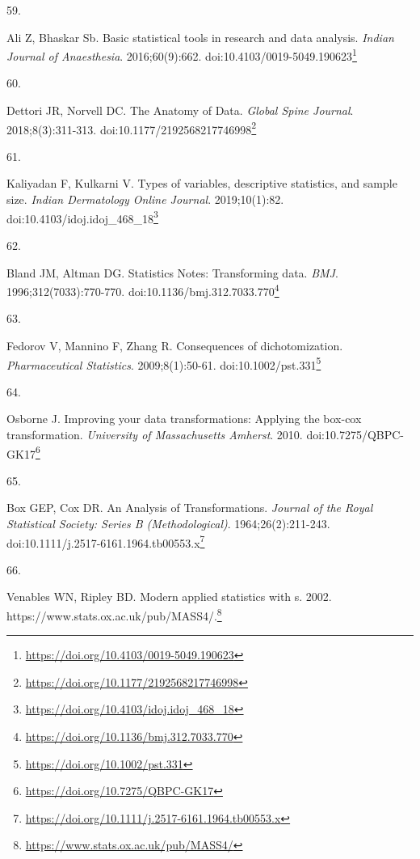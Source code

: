 \documentclass[
  a4paper,
]{book}
\newlength{\cslhangindent}
\newlength{\csllabelwidth}
\newlength{\cslentryspacingunit} %
\newenvironment{CSLReferences}[2] %
 {%
  \setlength{\parindent}{0pt}
  \ifodd #1
  \let\oldpar\par
  \def\par{\hangindent=\cslhangindent\oldpar}
  \fi
  \setlength{\parskip}{#2\cslentryspacingunit}
 }%
 {}
\newcommand{\CSLLeftMargin}[1]{\parbox[t]{\csllabelwidth}{#1}}
\newcommand{\CSLRightInline}[1]{\parbox[t]{\linewidth - \csllabelwidth}{#1}\break}
\renewcommand{\href}[2]{#2\footnote{\url{#1}}}
\begin{document}
\begin{CSLReferences}{0}{0}
\leavevmode{}%
\CSLLeftMargin{59. }%
\CSLRightInline{Ali Z, Bhaskar Sb. Basic statistical tools in research and data analysis. \emph{Indian Journal of Anaesthesia}. 2016;60(9):662. doi:\href{https://doi.org/10.4103/0019-5049.190623}{10.4103/0019-5049.190623}}

\leavevmode{}%
\CSLLeftMargin{60. }%
\CSLRightInline{Dettori JR, Norvell DC. The Anatomy of Data. \emph{Global Spine Journal}. 2018;8(3):311-313. doi:\href{https://doi.org/10.1177/2192568217746998}{10.1177/2192568217746998}}

\leavevmode{}%
\CSLLeftMargin{61. }%
\CSLRightInline{Kaliyadan F, Kulkarni V. Types of variables, descriptive statistics, and sample size. \emph{Indian Dermatology Online Journal}. 2019;10(1):82. doi:\href{https://doi.org/10.4103/idoj.idoj_468_18}{10.4103/idoj.idoj\_468\_18}}

\leavevmode{}%
\CSLLeftMargin{62. }%
\CSLRightInline{Bland JM, Altman DG. Statistics Notes: Transforming data. \emph{BMJ}. 1996;312(7033):770-770. doi:\href{https://doi.org/10.1136/bmj.312.7033.770}{10.1136/bmj.312.7033.770}}

\leavevmode{}%
\CSLLeftMargin{63. }%
\CSLRightInline{Fedorov V, Mannino F, Zhang R. Consequences of dichotomization. \emph{Pharmaceutical Statistics}. 2009;8(1):50-61. doi:\href{https://doi.org/10.1002/pst.331}{10.1002/pst.331}}

\leavevmode{}%
\CSLLeftMargin{64. }%
\CSLRightInline{Osborne J. Improving your data transformations: Applying the box-cox transformation. \emph{University of Massachusetts Amherst}. 2010. doi:\href{https://doi.org/10.7275/QBPC-GK17}{10.7275/QBPC-GK17}}

\leavevmode{}%
\CSLLeftMargin{65. }%
\CSLRightInline{Box GEP, Cox DR. An Analysis of Transformations. \emph{Journal of the Royal Statistical Society: Series B (Methodological)}. 1964;26(2):211-243. doi:\href{https://doi.org/10.1111/j.2517-6161.1964.tb00553.x}{10.1111/j.2517-6161.1964.tb00553.x}}

\leavevmode{}%
\CSLLeftMargin{66. }%
\CSLRightInline{Venables WN, Ripley BD. Modern applied statistics with s. 2002. \href{https://www.stats.ox.ac.uk/pub/MASS4/}{https://www.stats.ox.ac.uk/pub/MASS4/.}}


\end{CSLReferences}
\end{document}
